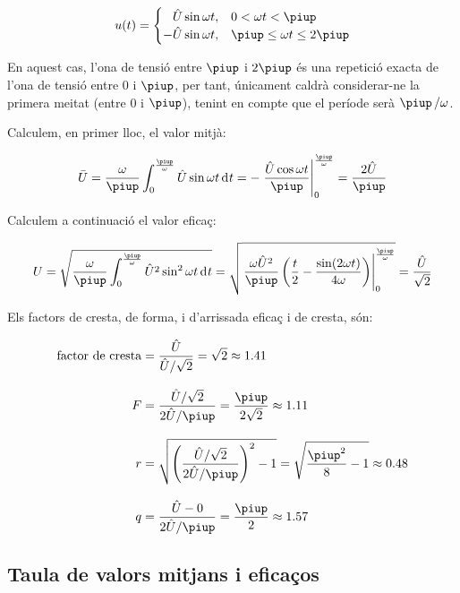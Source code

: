 \begin{exemple}[\FactorsCrestaFormaArr{}]
    \[
    u(t) = \begin{cases} \phantom{-}\hat{U} \sin\omega t, & 0 < \omega t < \piup\\
           -\hat{U} \sin\omega t, & \piup \leq \omega t \leq 2\piup \end{cases}
    \]

    En aquest cas, l'ona de tensió entre $\piup$ i $2\piup$ és una repetició
    exacta de l'ona de tensió entre 0 i $\piup$, per tant, únicament
    caldrà considerar-ne la primera meitat (entre 0 i $\piup$), tenint en
    compte que el període serà $\piup\,/\omega$.

     Calculem, en primer lloc, el valor mitjà:
     
     \[
    \bar{U} = \frac{\omega}{\piup} \int_0^\frac{\piup}{\omega} \hat{U}
    \sin\omega t \diff t  = - \left. \frac{\hat{U} \cos\omega t}{\piup}
    \right|_0^\frac{\piup}{\omega} = \frac{2 \hat{U}}{\piup}
    \]

    Calculem a continuació el valor eficaç:
    
    \[
    U = \sqrt{\frac{\omega}{\piup} \int_0^\frac{\piup}{\omega} \hat{U}^2
    \sin^2\omega t \diff t } =   \sqrt{\left.\frac{\omega
    \hat{U}^2}{\piup}\left( \frac{t}{2} - \frac{\sin (2\omega t)}{4\omega}
    \right)\right|_0^\frac{\piup}{\omega}}  = \frac{\hat{U}}{\sqrt{2}}
    \]

    Els factors de cresta, de forma, i d'arrissada eficaç i de cresta, són:
    
    \begin{align*}
        \text{factor de cresta} &= \frac{\hat{U}}{\hat{U}/\sqrt{2}} = \sqrt{2} \approx\num{1,41} \\[2ex]
        F &= \frac{\hat{U}/\sqrt{2}}{2 \hat{U}/\piup} =\frac{\piup}{2\sqrt{2}} \approx
        \num{1,11} \\[2ex]
    r &= \sqrt{\left(\frac{\hat{U}/\sqrt{2}}{2 \hat{U}/\piup}\right)^2-1}
    = \sqrt{\frac{\piup^2}{8}-1} \approx \num{0,48}\\[2ex]
    q &=  \frac{\hat{U} - 0}{2 \hat{U}/\piup} = \frac{\piup}{2} \approx \num{1,57}
    \end{align*}
\end{exemple}


\subsection{Taula de valors mitjans i eficaços}

